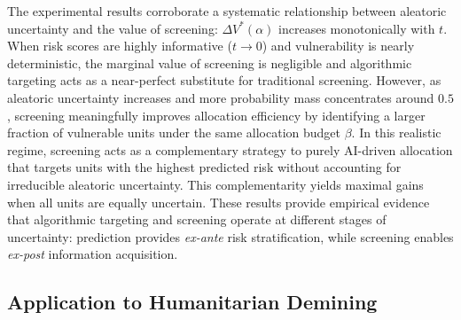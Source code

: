 The experimental results corroborate a systematic relationship between aleatoric uncertainty and the value of screening: $\Delta V^*(\alpha)$ increases monotonically with $t$. When risk scores are highly informative ($t\to 0$) and vulnerability is nearly deterministic, the marginal value of screening is negligible and algorithmic targeting acts as a near-perfect substitute for traditional screening. However, as aleatoric uncertainty increases and more probability mass concentrates around $0.5$, screening meaningfully improves allocation efficiency by identifying a larger fraction of vulnerable units under the same allocation budget $\beta$. In this realistic regime, screening acts as a complementary strategy to purely AI-driven allocation that targets units with the highest predicted risk without accounting for irreducible aleatoric uncertainty. This complementarity yields maximal gains when all units are equally uncertain. These results provide empirical evidence that algorithmic targeting and screening operate at different stages of uncertainty: prediction provides \textit{ex-ante} risk stratification, while screening enables \textit{ex-post} information acquisition. 



\subsection{Application to Humanitarian Demining} 

